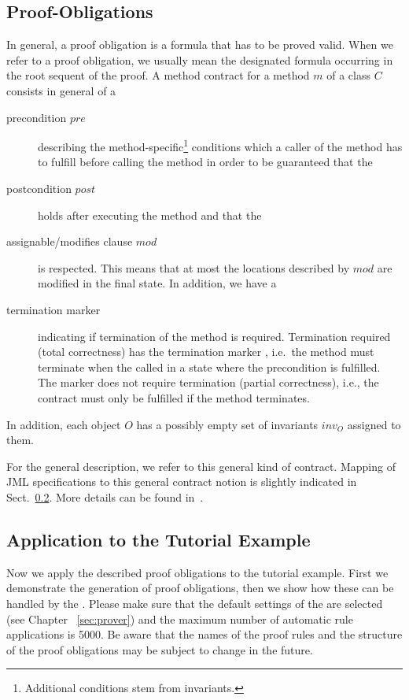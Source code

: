% 
\subsection{Proof-Obligations}

In general, a proof obligation is a formula that has to be proved
valid. When we refer to a proof obligation, we usually mean the
designated formula occurring in the root sequent of the proof.
%
A method contract for a method $m$ of a class $C$ consists in general
of a 
\begin{description}
  \item[precondition $pre$] describing the method-specific\footnote{Additional conditions stem from invariants.}
    conditions which a caller of the method has to fulfill before calling the
    method in order to be guaranteed that the
  \item[postcondition $post$] holds after executing the method and
    that the 
  \item[assignable/modifies clause $mod$] is respected. This means
    that at most the locations described by $mod$ are modified in the
    final state. In addition, we have a
  \item[termination marker] indicating if termination of the method is
    required. Termination required (total correctness) has the termination
    marker , i.e.\ the method must terminate when the
    called in a state where the precondition is fulfilled. The marker
     does not require termination (partial correctness), i.e.,
    the contract must only be fulfilled if the method terminates.
\end{description}

In addition, each object $O$ has a possibly empty set of invariants
$inv_{O}$ assigned to them.

For the general description, we refer to this general kind of
contract. Mapping of JML specifications to this general contract notion
is slightly indicated in Sect.~\ref{sec:application}. More details can
be found in~\cite{KeYBook2016}.

\subsection{Application to the Tutorial Example}
\label{sec:application}

Now we apply the described proof obligations to the tutorial
example. First  we demonstrate the generation of proof obligations,
then we show how these can be handled by the \kp. Please make sure
that the default settings of the \kp{} are selected (see Chapter~%
\ref{sec:prover}) and the maximum number of automatic rule applications is
5000. Be aware that the names of the proof rules and the structure of
the proof obligations may be subject to change in the future.


